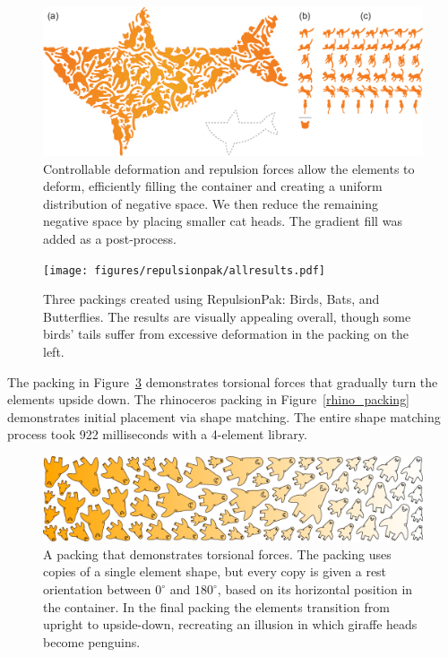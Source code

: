 \begin{figure}
  \centering
  \includegraphics[width=1.0\textwidth]{figures/repulsionpak/cat_whale_04}
  \caption[A packing of a cat]
  {
  \label{cat_packing}
           Controllable deformation and repulsion forces allow the elements to deform,
           efficiently filling the container and creating a uniform distribution of
           negative space. We then reduce the remaining negative space by placing smaller
           cat heads. The gradient fill was added as a post-process.}
\end{figure}

\begin{figure}
\centering
\texttt{[image: figures/repulsionpak/allresults.pdf]} 
\caption[Three packings created using RepulsionPak: \newline Birds, Bats, and Butterflies]
{\label{three_packings} Three packings created using RepulsionPak: Birds, Bats, and Butterflies. The results are visually appealing overall, though some birds' tails suffer from excessive deformation in
the packing on the left.}
\end{figure}

The packing in Figure~\ref{giraffe_penguin_packing} demonstrates torsional forces
that gradually turn the elements upside down. 
The rhinoceros packing in Figure~\ref{rhino_packing} demonstrates initial placement via shape matching.
The entire shape matching process took 922 milliseconds with a 4-element library.



\begin{figure}
\centering
\includegraphics[width=1.0\textwidth]{figures/repulsionpak/giraffe_penguin.pdf}
\caption[A packing that demonstrates torsional forces]
{\label{giraffe_penguin_packing}
A packing that demonstrates torsional forces.
The packing uses copies of a single element shape, but every copy is given a rest orientation between $0^\circ$
and $180^\circ$, based on its horizontal position in the container.  In the final packing the elements transition
from upright to upside-down, recreating an illusion in which giraffe heads become penguins.}
\end{figure}

